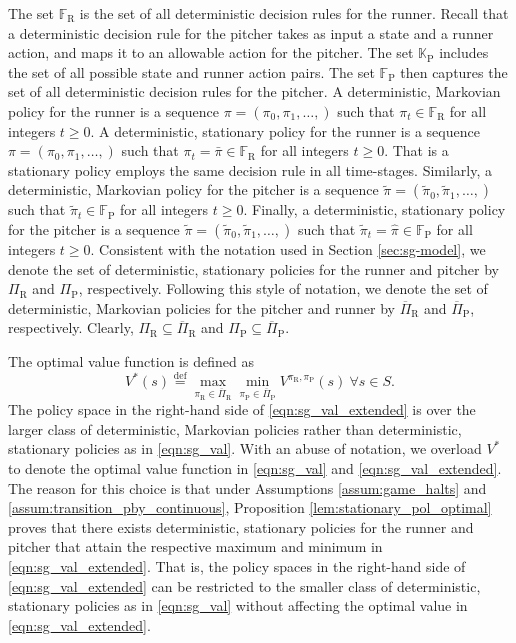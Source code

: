 \documentclass[11pt]{article}
\newcommand{\defeq}{\stackrel{\text{def}}{=}}
\begin{document}
       \noindent The set $\mathbb{F}_\text{R}$ is the set of all deterministic decision rules for the runner. Recall that a deterministic decision rule for the pitcher takes as input a state and a runner action, and maps it to an allowable action for the pitcher. The set $\mathbb{K}_\text{P}$ includes the set of all possible state and runner action pairs. The set $\mathbb{F}_\text{P}$ then captures the set of all deterministic decision rules for the pitcher. A deterministic, Markovian policy for the runner is a sequence $\pi = (\pi_0,\pi_1,\ldots,)$ such that $\pi_t \in \mathbb{F}_\text{R}$ for all integers $t \geq 0$. A deterministic, stationary policy for the runner is a sequence $\pi = (\pi_0,\pi_1,\ldots,)$ such that $\pi_t = \bar\pi \in \mathbb{F}_\text{R}$ for all integers $t \geq 0$. That is a stationary policy employs the same decision rule in all time-stages. Similarly, a deterministic, Markovian policy for the pitcher is a sequence $\tilde\pi = (\tilde\pi_0,\tilde\pi_1,\ldots,)$ such that $\tilde\pi_t \in \mathbb{F}_\text{P}$ for all integers $t \geq 0$. Finally, a deterministic, stationary policy for the pitcher is a sequence $\tilde\pi = (\tilde\pi_0,\tilde\pi_1,\ldots,)$ such that $\tilde\pi_t = \hat\pi \in \mathbb{F}_\text{P}$ for all integers $t \geq 0$. Consistent with the notation used in Section \ref{sec:sg-model}, we denote the set of deterministic, stationary policies for the runner and pitcher by $\Pi_\text{R}$ and $\Pi_\text{P}$, respectively. Following this style of notation, we denote the set of deterministic, Markovian policies for the pitcher and runner by $\overline\Pi_\text{R}$ and $\overline\Pi_\text{P}$, respectively. Clearly, $\Pi_\text{R} \subseteq \overline\Pi_\text{R}$ and $\Pi_\text{P} \subseteq \overline\Pi_\text{P}$.
    
       The optimal value function is defined as
       \begingroup
       \allowdisplaybreaks
       \begin{equation}
            \label{eqn:sg_val_extended}
            V^*(s) \defeq \max_{\pi_\text{R} \in \overline\Pi_\text{R}}\min_{\pi_\text{P} \in \overline\Pi_\text{P}}V^{\pi_\text{R},\pi_\text{P}}(s) \ \forall s \in S.
       \end{equation}
       \endgroup
       The policy space in the right-hand side of \eqref{eqn:sg_val_extended} is over the larger class of deterministic, Markovian policies rather than deterministic, stationary policies as in \eqref{eqn:sg_val}. With an abuse of notation, we overload $V^*$ to denote the optimal value function in \eqref{eqn:sg_val} and \eqref{eqn:sg_val_extended}. The reason for this choice is that under Assumptions \ref{assum:game_halts} and \ref{assum:transition_pby_continuous}, Proposition \ref{lem:stationary_pol_optimal} proves that there exists  deterministic, stationary policies for the runner and pitcher that attain the respective maximum and minimum in \eqref{eqn:sg_val_extended}. That is, the policy spaces in the right-hand side of \eqref{eqn:sg_val_extended} can be restricted to the smaller class of deterministic, stationary policies as in \eqref{eqn:sg_val} without affecting the optimal value in \eqref{eqn:sg_val_extended}. 
        
\end{document}
